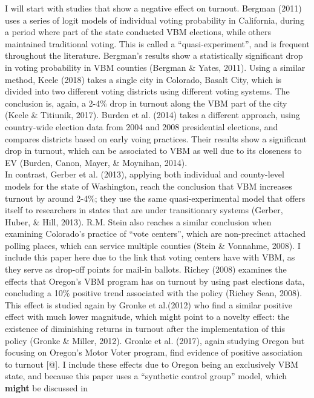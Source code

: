 \documentclass[12pt,twoside]{reedthesis}
\begin{document}
  I will start with studies that show a negative effect on turnout.
  Bergman (2011) uses a series of logit models of individual voting
  probability in California, during a period where part of the state
  conducted VBM elections, while others maintained traditional voting.
  This is called a ``quasi-experiment'', and is frequent throughout the
  literature. Bergman's results show a statistically significant drop in
  voting probability in VBM counties (Bergman \& Yates, 2011). Using a
  similar method, Keele (2018) takes a single city in Colorado, Basalt
  City, which is divided into two different voting districts using
  different voting systems. The conclusion is, again, a 2-4\% drop in
  turnout along the VBM part of the city (Keele \& Titiunik, 2017). Burden
  et al. (2014) takes a different approach, using country-wide election
  data from 2004 and 2008 presidential elections, and compares districts
  based on early voing practices. Their results show a significant drop in
  turnout, which can be associated to VBM as well due to its closeness to
  EV (Burden, Canon, Mayer, \& Moynihan, 2014).\\
  In contrast, Gerber et al. (2013), applying both individual and
  county-level models for the state of Washington, reach the conclusion
  that VBM increases turnout by around 2-4\%; they use the same
  quasi-experimental model that offers itself to researchers in states
  that are under transitionary systems (Gerber, Huber, \& Hill, 2013).
  R.M. Stein also reaches a similar conclusion when examining Colorado's
  practice of ``vote centers'', which are non-precinct attached polling
  places, which can service multiple counties (Stein \& Vonnahme, 2008). I
  include this paper here due to the link that voting centers have with
  VBM, as they serve as drop-off points for mail-in ballots. Richey (2008)
  examines the effects that Oregon's VBM program has on turnout by using
  past elections data, concluding a 10\% positive trend associated with
  the policy (Richey Sean, 2008). This effect is studied again by Gronke
  et al.(2012) who find a similar positive effect with much lower
  magnitude, which might point to a novelty effect: the existence of
  diminishing returns in turnout after the implementation of this policy
  (Gronke \& Miller, 2012). Gronke et al. (2017), again studying Oregon
  but focusing on Oregon's Motor Voter program, find evidence of positive
  association to turnout {[}@{]}. I include these effects due to Oregon
  being an exclusively VBM state, and because this paper uses a
  ``synthetic control group'' model, which \textbf{might} be discussed in
\end{document}
